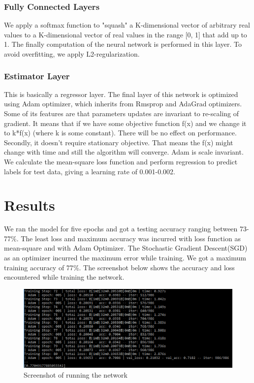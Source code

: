 \documentclass[journal]{IEEEtran}
\begin{document}
\subsubsection{Fully Connected Layers}
We apply a softmax function to  "squash" a K-dimensional vector  of arbitrary real values to a K-dimensional vector of real values in the range [0, 1] that add up to 1. The finally computation of the neural network is performed in this layer. To avoid overfitting, we apply L2-regularization. 

\subsubsection{Estimator Layer}
This is basically a regressor layer. The final layer of this network is optimized using Adam optimizer, which inherits from Rmsprop and AdaGrad optimizers. Some of its features are that parameters updates are invariant to re-scaling of gradient. It means that if we have some objective function f(x) and we change it to k*f(x) (where k is some constant). There will be no effect on performance. Secondly, it doesn’t require stationary objective. That means the f(x) might change with time and still the algorithm will converge. Adam is scale invariant. We calculate the mean-square loss function and perform regression to predict labels for test data, giving a learning rate of 0.001-0.002. 


\section{Results}
We ran the model for five epochs and got a testing accuracy ranging between 73-77$\%$. The least loss and maximum accuracy was incurred with loss function as mean-square and with Adam Optimizer. The Stochastic Gradient Descent(SGD) as an optimizer incurred the maximum error while training. We got a maximum training accuracy of 77$\%$. The screenshot below shows the accuracy and loss encountered while training the network.

\begin{figure}[ht!]
    \centering
    \includegraphics[scale = 0.35]{run.PNG}
    \caption{Screenshot of running the network}
    \label{fig:run}
\end{figure}
\end{document}
